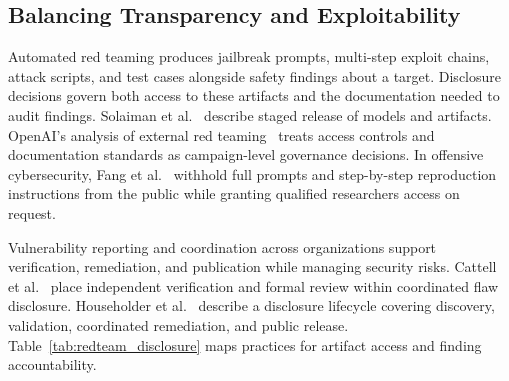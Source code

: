 \documentclass[review]{fcs}
\let\fcsOriginalCite\cite
\renewcommand{\cite}[1]{\allowbreak\fcsOriginalCite{#1}}
\begin{document}
\subsection{Balancing Transparency and Exploitability}

Automated red teaming produces jailbreak prompts, multi-step exploit chains, attack scripts, and test cases alongside safety findings about a target. Disclosure decisions govern both access to these artifacts and the documentation needed to audit findings. Solaiman et al.~\cite{solaiman2019release} describe staged release of models and artifacts. OpenAI's analysis of external red teaming~\cite{ahmad2025externalredteaming} treats access controls and documentation standards as campaign-level governance decisions. In offensive cybersecurity, Fang et al.~\cite{fang2024llmagentsautonomouslyhack} withhold full prompts and step-by-step reproduction instructions from the public while granting qualified researchers access on request.

Vulnerability reporting and coordination across organizations support verification, remediation, and publication while managing security risks. Cattell et al.~\cite{cattell2024coordinatedflaw} place independent verification and formal review within coordinated flaw disclosure. Householder et al.~\cite{householder2024lessons} describe a disclosure lifecycle covering discovery, validation, coordinated remediation, and public release. Table~\ref{tab:redteam_disclosure} maps practices for artifact access and finding accountability.
\end{document}

